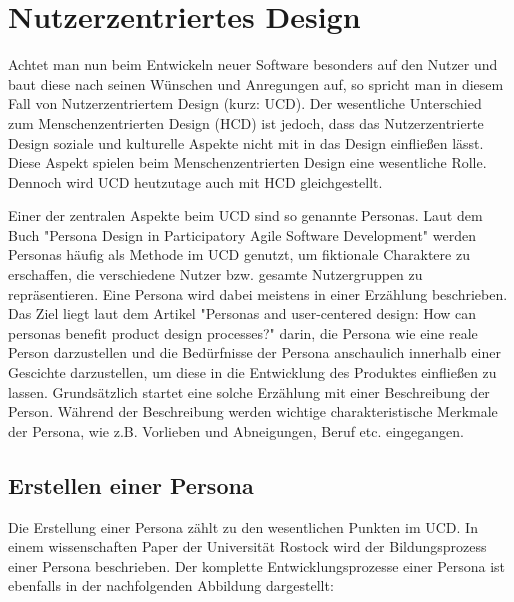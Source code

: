 \section{Nutzerzentriertes Design}
Achtet man nun beim Entwickeln neuer Software besonders auf den Nutzer und baut diese nach seinen Wünschen und Anregungen auf, so spricht man in diesem Fall von Nutzerzentriertem Design (kurz: UCD). Der wesentliche Unterschied zum Menschenzentrierten Design (HCD) ist jedoch, dass das Nutzerzentrierte Design soziale und kulturelle Aspekte nicht mit in das Design einfließen lässt.\cite{hcd2:2021} Diese Aspekt spielen beim Menschenzentrierten Design eine wesentliche Rolle. Dennoch wird UCD heutzutage auch mit HCD gleichgestellt.\cite{ucd1:2011}

Einer der zentralen Aspekte beim UCD sind so genannte Personas. Laut dem Buch "Persona Design in Participatory Agile Software Development" werden Personas häufig als Methode im UCD genutzt, um fiktionale Charaktere zu erschaffen, die verschiedene Nutzer bzw. gesamte Nutzergruppen zu repräsentieren.\cite{personaDesign:2020} Eine Persona wird dabei meistens in einer Erzählung beschrieben.\cite{ucd1:2011} Das Ziel liegt laut dem Artikel "Personas and user-centered design: How can personas benefit product design processes?" darin, die Persona wie eine reale Person darzustellen und die Bedürfnisse der Persona anschaulich innerhalb einer Gescichte darzustellen, um diese in die Entwicklung des Produktes einfließen zu lassen.\cite{ucd1:2011}
Grundsätzlich startet eine solche Erzählung mit einer Beschreibung der Person.\cite{ucd1:2011} Während der Beschreibung werden wichtige charakteristische Merkmale der Persona, wie z.B. Vorlieben und Abneigungen, Beruf etc. eingegangen.\cite{ucd1:2011}

\subsection{Erstellen einer Persona}
Die Erstellung einer Persona zählt zu den wesentlichen Punkten im UCD. In einem wissenschaften Paper der Universität Rostock wird der Bildungsprozess einer Persona beschrieben. Der komplette Entwicklungsprozesse einer Persona ist ebenfalls in der nachfolgenden Abbildung dargestellt:

